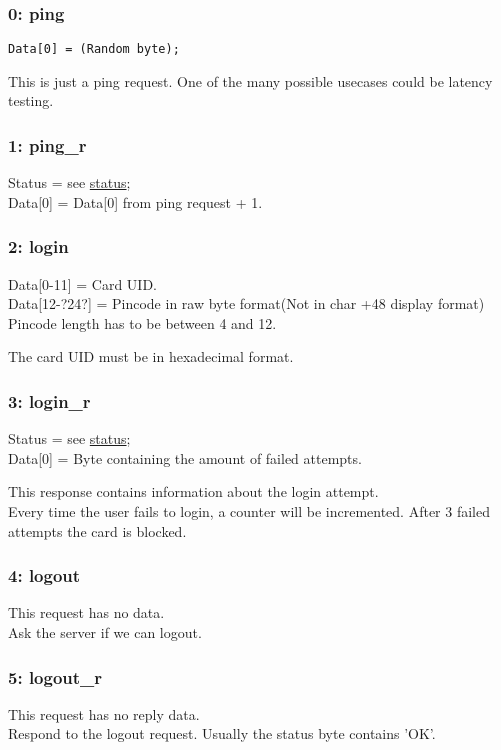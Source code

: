 \documentclass[12pt]{article}
\begin{document}
\subsubsection{0: ping}
\begin{lstlisting}[style=cpp]
Data[0] = (Random byte);
\end{lstlisting}

This is just a ping request. One of the many possible usecases could be latency testing.

\subsubsection{1: ping\_r}
Status = see \hyperref[hfst:status]{status};\\
Data[0] = Data[0] from ping request + 1.

\subsubsection{2: login}
Data[0-11] = Card UID.\\
Data[12-?24?] = Pincode in raw byte format(Not in char +48 display format)\\
Pincode length has to be between 4 and 12.

The card UID must be in hexadecimal format.

\subsubsection{3: login\_r}
Status = see \hyperref[hfst:status]{status};\\
Data[0] = Byte containing the amount of failed attempts.

This response contains information about the login attempt.\\
Every time the user fails to login, a counter will be incremented.
After 3 failed attempts the card is blocked.

\subsubsection{4: logout}
This request has no data.\\
Ask the server if we can logout.

\subsubsection{5: logout\_r}
This request has no reply data.\\
Respond to the logout request. Usually the status byte contains 'OK'.
\end{document}
